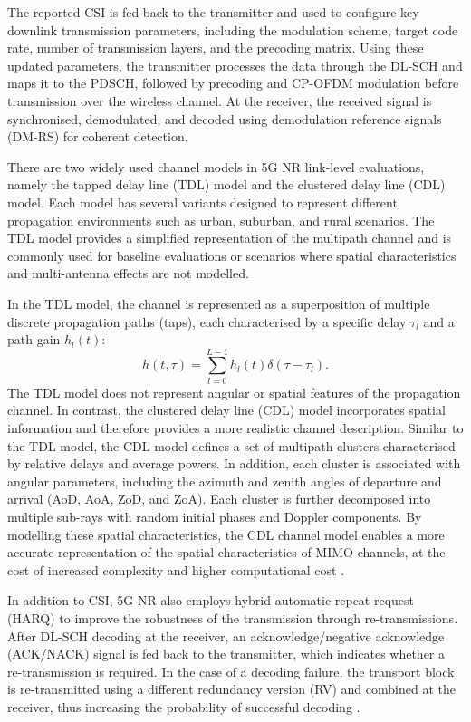 \documentclass[a4paper,12pt,onecolumn]{article}
\begin{document}
	\begin{highlightblock}	
		The reported CSI is fed back to the transmitter and used to configure key downlink transmission parameters, including the modulation scheme, target code rate, number of transmission layers, and the precoding matrix. Using these updated parameters, the transmitter processes the data through the DL-SCH and maps it to the PDSCH, followed by precoding and CP-OFDM modulation before transmission over the wireless channel. At the receiver, the received signal is synchronised, demodulated, and decoded using demodulation reference signals (DM-RS) for coherent detection.
		
		
		There are two widely used channel models in 5G NR link-level evaluations, namely the tapped delay line (TDL) model and the clustered delay line (CDL) model. Each model has several variants designed to represent different propagation environments such as urban, suburban, and rural scenarios. The TDL model provides a simplified representation of the multipath channel and is commonly used for baseline evaluations or scenarios where spatial characteristics and multi-antenna effects are not modelled.
		
		In the TDL model, the channel is represented as a superposition of multiple discrete propagation paths (taps), each characterised by a specific delay $\tau_l$ and a path gain $h_l(t)$:
		\begin{equation}
			h(t, \tau)=\sum_{l=0}^{L-1}h_l(t)\delta(\tau-\tau_l).
		\end{equation}
		The TDL model does not represent angular or spatial features of the propagation channel. In contrast, the clustered delay line (CDL) model incorporates spatial information and therefore provides a more realistic channel description. Similar to the TDL model, the CDL model defines a set of multipath clusters characterised by relative delays and average powers. In addition, each cluster is associated with angular parameters, including the azimuth and zenith angles of departure and arrival (AoD, AoA, ZoD, and ZoA). Each cluster is further decomposed into multiple sub-rays with random initial phases and Doppler components. By modelling these spatial characteristics, the CDL channel model enables a more accurate representation of the spatial characteristics of MIMO channels, at the cost of increased complexity and higher computational cost \cite{ETSI_TDL_CDL}.
		
		In addition to CSI, 5G NR also employs hybrid automatic repeat request (HARQ) to improve the robustness of the transmission through re-transmissions. After DL-SCH decoding at the receiver, an acknowledge/negative acknowledge (ACK/NACK) signal is fed back to the transmitter, which indicates whether a re-transmission is required. In the case of a decoding failure, the transport block is re-transmitted using a different redundancy version (RV) and combined at the receiver, thus increasing the probability of successful decoding \cite{EricssonBook} \cite{MathWorks2026}.
	\end{highlightblock}
\end{document}
